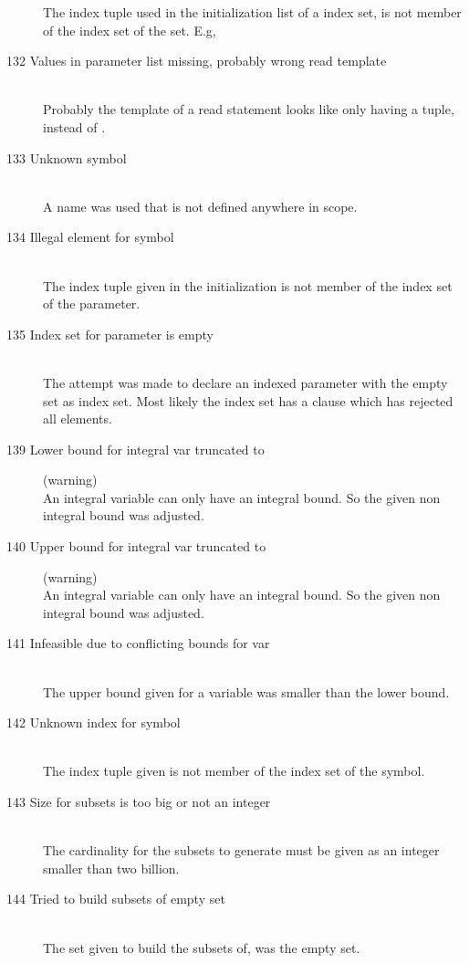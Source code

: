 \begin{description}
   The index tuple used in the initialization list of a index set, is
   not member of the index set of the set.
   E.g, 
\item[132 Values in parameter list missing, probably wrong read
  template]\ \\
  Probably the template of a read statement looks
  like  only having a tuple, instead of .
\item[133 Unknown symbol \code{xxx}]\ \\
  A name was used that is not defined anywhere in scope.
\item[134 Illegal element \code{xxx} for symbol]\ \\
  The index tuple given in the initialization is not member of the
  index set of the parameter.
\item[135 Index set for parameter \code{xxx} is empty]\ \\
  The attempt was made to declare an indexed parameter with the
  empty set as index set. Most likely the index set has a 
  clause which has rejected all elements.
%
%
\item[139 Lower bound for integral var \code{xxx} truncated to
  \code{yyy}] (warning)\ \\
  An integral variable can only have an integral bound. So the given
  non integral bound was adjusted.
\item[140 Upper bound for integral var \code{xxx} truncated to
  \code{yyy}] (warning)\ \\
  An integral variable can only have an integral bound. So the given
  non integral bound was adjusted.
\item[141 Infeasible due to conflicting bounds for var \code{xxx}]\ \\
  The upper bound given for a variable was smaller than the lower bound.
\item[142 Unknown index \code{xxx} for symbol \code{yyy}]\ \\
  The index tuple given is not member of the index set of the symbol.
\item[143 Size for subsets \code{xxx} is too big or not an integer]\ \\
  The cardinality for the subsets to generate must be given as an
  integer smaller than two billion.
\item[144 Tried to build subsets of empty set]\ \\
  The set given to build the subsets of, was the empty set.

\end{description}

